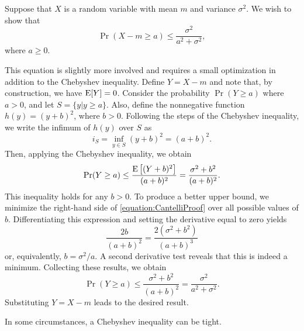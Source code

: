 \begin{example}
Suppose that $X$ is a random variable with mean $m$ and variance $\sigma^2$.
We wish to show that
\begin{equation*}
\Pr ( X - m \geq a ) \leq \frac{\sigma^2}{a^2 + \sigma^2},
\end{equation*}
where $a \geq 0$.

This equation is slightly more involved and requires a small optimization in addition to the Chebyshev inequality.
Define $Y = X - m$ and note that, by construction, we have $\mathrm{E} [Y] = 0$.
Consider the probability $\Pr (Y \geq a)$ where $a > 0$, and let $S = \{ y | y \geq a \}$.
Also, define the nonnegative function $h(y) = (y + b)^2$, where $b > 0$.
Following the steps of the Chebyshev inequality, we write the infimum of $h(y)$ over $S$ as
\begin{equation*}
i_S = \inf_{y \in S} (y + b)^2 = (a + b)^2 .
\end{equation*}
Then, applying the Chebyshev inequality, we obtain
\begin{equation} \label{equation:CantelliProof}
\Pr (Y \geq a) \leq \frac{ \mathrm{E} \left[ (Y + b)^2 \right] }{(a + b)^2}
= \frac{ \sigma^2 + b^2 }{ (a + b)^2 } .
\end{equation}
This inequality holds for any $b > 0$.
To produce a better upper bound, we minimize the right-hand side of \eqref{equation:CantelliProof} over all possible values of $b$.
Differentiating this expression and setting the derivative equal to zero yields
\begin{equation*}
\frac{ 2 b }{(a + b)^2 } = \frac{ 2 \left( \sigma^2 + b^2 \right) }{(a + b)^3}
\end{equation*}
or, equivalently, $b = \sigma^2 / a$.
A second derivative test reveals that this is indeed a minimum.
Collecting these results, we obtain
\begin{equation*}
\Pr (Y \geq a) \leq \frac{ \sigma^2 + b^2 }{ (a + b)^2 }
= \frac{ \sigma^2 }{ a^2 + \sigma^2 } .
\end{equation*}
Substituting $Y = X - m$ leads to the desired result.
\end{example}

In some circumstances, a Chebyshev inequality can be tight.


